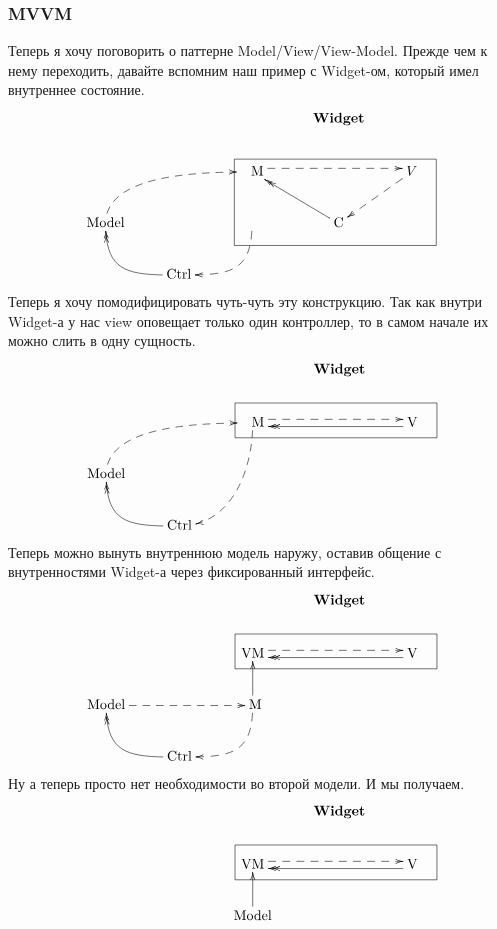 \subsubsection{MVVM}

Теперь я хочу поговорить о паттерне Model/View/View-Model.
Прежде чем к нему переходить, давайте вспомним наш пример с Widget-ом, который имел внутреннее состояние.
\[
\xymatrix{
  {}&{}&{}&{
  \textbf{Widget}
  }&{}\\
  {}&{}&{
  \phantom{\text{V}}\text{M}
  }
  \ar@{-->}@<0.6ex>[rr]
  {\save
  [].[rrd]*++[F-]\frm{}
  \restore
  }
  &{}&{
  V
  }
  {\save
  [].[d]*++\frm{}
  \restore
  }
  \ar@{-->}[dl]
  \\
  {
  \text{Model}
  }
  \ar@{-->}@(u,l)[urr]
  &{}&{\phantom{\text{Model}}}
  \ar@{-->}@(d,r)[dl]
  &{
  \text{C}
  }
  \ar@{->>}[ul]
  &{\phantom{\text{C}}}
  \\
  {}&{
 \text{Ctrl}
  }
  \ar@{->>}@(l,d)[ul]
  &{}&{}&{}\\
}
\]
Теперь я хочу помодифицировать чуть-чуть эту конструкцию.
Так как внутри Widget-а у нас view оповещает только один контроллер, то в самом начале их можно слить в одну сущность.
\[
\xymatrix{
  {}&{}&{}&{\textbf{Widget}}&{}\\
  {}&{}&{\phantom{\text{V}}\text{M}}\ar@{-->}@(d,r)[ddl]\ar@{-->}@<0.6ex>[rr]
  {\save
  [].[rr]*++[F-]\frm{}
  \restore
  }
  &{}&{\text{V}}\ar@{->>}@<0.6ex>[ll]\\
  {\text{Model}}\ar@{-->}@(u,l)[urr]&{}&{\phantom{\text{Model}}}&{}&{\phantom{\text{C}}}\\
  {}&{\text{Ctrl}}\ar@{->>}@(l,d)[ul]&{}&{}&{}\\
}
\]
Теперь можно вынуть внутреннюю модель наружу, оставив общение с внутренностями Widget-а через фиксированный интерфейс.
\[
\xymatrix{
  {}&{}&{}&{\textbf{Widget}}&{}\\
  {}&{}&{\text{VM}}\ar@{-->}@<0.6ex>[rr]
  {\save
  [].[rr]*++[F-]\frm{}
  \restore
  }
  &{}&{\text{V}}\ar@{->>}@<0.6ex>[ll]\\
  {\text{Model}}\ar@{-->}[rr]+(-2,0)&{}&{\phantom{\text{od}}\text{M}\phantom{\text{el}}}\ar@{->}[u]\ar@{-->}@(d,r)[dl]&{}&{}\\
  {}&{\text{Ctrl}}\ar@{->>}@(l,d)[ul]&{}&{}&{}\\
}
\]
Ну а теперь просто нет необходимости во второй модели.
И мы получаем.
\[
\xymatrix{
  {}&{}&{}&{\textbf{Widget}}&{}\\
  {}&{}&{\text{VM}}\ar@{-->}@<0.6ex>[rr]
  {\save
  [].[rr]*++[F-]\frm{}
  \restore
  }
  &{}&{\text{V}}\ar@{->>}@<0.6ex>[ll]\\
  {\phantom{\text{Model}}}&{}&{\text{Model}}\ar@{->}[u]&{}&{}\\
  {}&{\phantom{\text{Ctrl}}}&{}&{}&{}\\
}
\]
